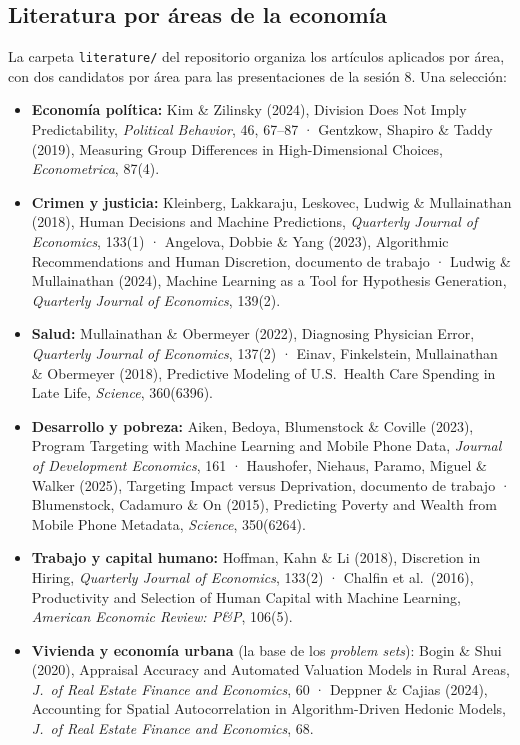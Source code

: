 \documentclass[12pt,a4paper]{article}
\begin{document}
\subsection*{Literatura por áreas de la economía}

La carpeta \texttt{literature/} del repositorio organiza los artículos aplicados por área, con dos candidatos por área para las presentaciones de la sesión 8. Una selección:

\begin{itemize}
    \item \textbf{Economía política:} Kim \& Zilinsky (2024), Division Does Not Imply Predictability, \textit{Political Behavior}, 46, 67--87 · Gentzkow, Shapiro \& Taddy (2019), Measuring Group Differences in High-Dimensional Choices, \textit{Econometrica}, 87(4).
    \item \textbf{Crimen y justicia:} Kleinberg, Lakkaraju, Leskovec, Ludwig \& Mullainathan (2018), Human Decisions and Machine Predictions, \textit{Quarterly Journal of Economics}, 133(1) · Angelova, Dobbie \& Yang (2023), Algorithmic Recommendations and Human Discretion, documento de trabajo · Ludwig \& Mullainathan (2024), Machine Learning as a Tool for Hypothesis Generation, \textit{Quarterly Journal of Economics}, 139(2).
    \item \textbf{Salud:} Mullainathan \& Obermeyer (2022), Diagnosing Physician Error, \textit{Quarterly Journal of Economics}, 137(2) · Einav, Finkelstein, Mullainathan \& Obermeyer (2018), Predictive Modeling of U.S.\ Health Care Spending in Late Life, \textit{Science}, 360(6396).
    \item \textbf{Desarrollo y pobreza:} Aiken, Bedoya, Blumenstock \& Coville (2023), Program Targeting with Machine Learning and Mobile Phone Data, \textit{Journal of Development Economics}, 161 · Haushofer, Niehaus, Paramo, Miguel \& Walker (2025), Targeting Impact versus Deprivation, documento de trabajo · Blumenstock, Cadamuro \& On (2015), Predicting Poverty and Wealth from Mobile Phone Metadata, \textit{Science}, 350(6264).
    \item \textbf{Trabajo y capital humano:} Hoffman, Kahn \& Li (2018), Discretion in Hiring, \textit{Quarterly Journal of Economics}, 133(2) · Chalfin et al.\ (2016), Productivity and Selection of Human Capital with Machine Learning, \textit{American Economic Review: P\&P}, 106(5).
    \item \textbf{Vivienda y economía urbana} (la base de los \emph{problem sets}): Bogin \& Shui (2020), Appraisal Accuracy and Automated Valuation Models in Rural Areas, \textit{J.\ of Real Estate Finance and Economics}, 60 · Deppner \& Cajias (2024), Accounting for Spatial Autocorrelation in Algorithm-Driven Hedonic Models, \textit{J.\ of Real Estate Finance and Economics}, 68.

\end{itemize}
\end{document}
